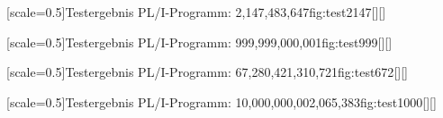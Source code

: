 [scale=0.5]{Testergebnis PL/I-Programm: 2,147,483,647}{fig:test2147}[][]

[scale=0.5]{Testergebnis PL/I-Programm: 999,999,000,001}{fig:test999}[][]

[scale=0.5]{Testergebnis PL/I-Programm: 67,280,421,310,721}{fig:test672}[][]

[scale=0.5]{Testergebnis PL/I-Programm: 10,000,000,002,065,383}{fig:test1000}[][]


